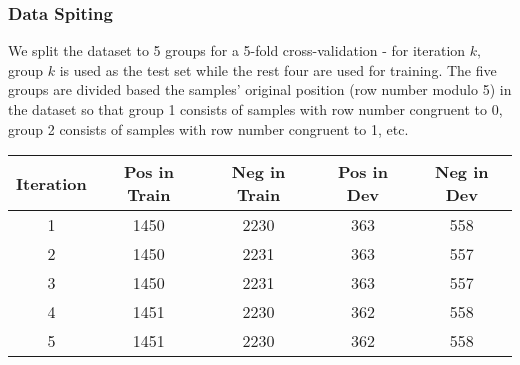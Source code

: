 \documentclass[letterpaper]{article}
\begin{document}
\subsubsection{Data Spiting}
We split the dataset to 5 groups for a 5-fold cross-validation - for iteration $k,$ group $k$ is used as the test set while the rest four are used for training. The five groups are divided based the samples' original position (row number modulo 5) in the dataset so that group 1 consists of samples with row number congruent to 0, group 2 consists of samples with row number congruent to 1, etc.
\begin{center}
\begin{tabular}{|c|c|c|c|c|}
\hline
\textbf{Iteration} & \textbf{Pos in Train} & \textbf{Neg in Train} & \textbf{Pos in Dev} & \textbf{Neg in Dev} \\ \hline
1                  & 1450                  & 2230                  & 363                 & 558                 \\ \hline
2                  & 1450                  & 2231                  & 363                 & 557                 \\ \hline
3                  & 1450                  & 2231                  & 363                 & 557                 \\ \hline
4                  & 1451                  & 2230                  & 362                 & 558                 \\ \hline
5                  & 1451                  & 2230                  & 362                 & 558                 \\ \hline
\end{tabular}
\end{center}
\end{document}
